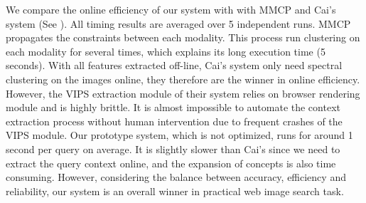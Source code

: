 We compare the online efficiency of our system with
with MMCP and Cai's system%
(See ).
All timing results are averaged over 5 independent runs.
MMCP propagates the constraints between each modality. This process run clustering
on each modality for several times, which explains its long execution time (5 seconds).
With all features extracted off-line, Cai's system
only need spectral clustering on the images online,
they therefore are the winner in online efficiency.
However, the VIPS extraction module of their system relies on
browser rendering module and is highly brittle. It is almost impossible to
automate the context extraction process without human intervention due to
frequent crashes of the VIPS module.
Our prototype system, which is not optimized,
runs for around 1 second per query on average.
It is slightly slower than Cai's %
since we need to extract the query context online,
and the expansion of concepts is also time consuming.
However, considering the balance between accuracy, efficiency and reliability,
our system is an overall winner in practical web image search task.

